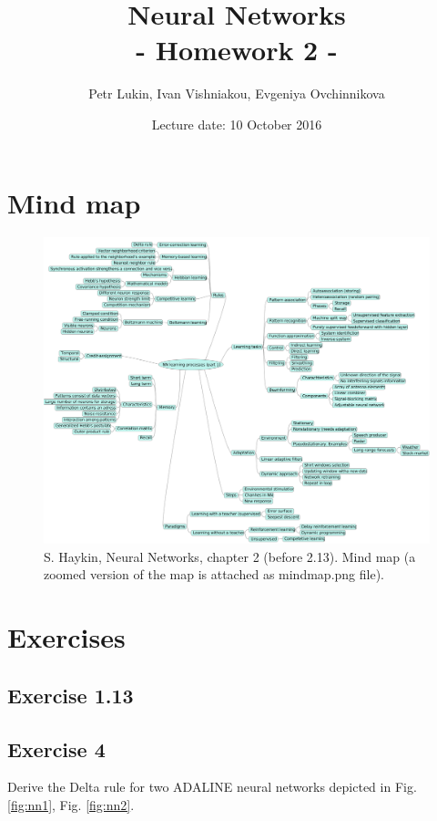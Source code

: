 \documentclass[a4paper, 12pt]{article}
\title{Neural Networks  \\
				- Homework 2 -}
\author{Petr Lukin, Ivan Vishniakou, Evgeniya Ovchinnikova}
\date{Lecture date: 10 October 2016}
\begin{document}
\maketitle

\section{Mind map}

\begin{figure}[h]
  \centering
  \caption{S. Haykin, Neural Networks, chapter 2 (before 2.13). Mind map (a zoomed version of the map is attached as mindmap.png file).\label{fig:mindMap}}
  \includegraphics[width=1.0\textwidth]{mindmap}
\end{figure}

\section{Exercises}

\subsection{Exercise 1.13}

\subsection{Exercise 4}

Derive the Delta rule for two ADALINE neural networks depicted in Fig. \ref{fig:nn1}, Fig. \ref{fig:nn2}.
\end{document}
